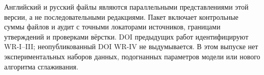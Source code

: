 {Английский и русский файлы являются параллельными представлениями этой версии, а не последовательными редакциями. Пакет включает контрольные суммы файлов и аудит с точными локаторами источников, границами утверждений и проверками вёрстки. DOI предыдущих работ идентифицируют WR-I--III; неопубликованный DOI WR-IV не выдумывается. В этом выпуске нет экспериментальных наборов данных, подогнанных параметров модели или нового алгоритма сглаживания.}

